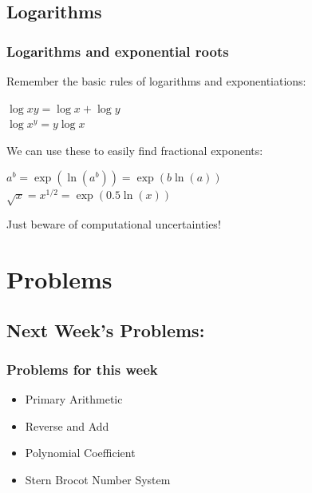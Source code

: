 \documentclass{beamer}
\begin{document}
\subsection{Logarithms}

\begin{frame}
  \frametitle{Logarithms and exponential roots} 

  Remember the basic rules of logarithms and exponentiations:
  \begin{center}
    $\log{xy} = \log{x} + \log{y}$\\
    $\log{x^y} = y\log{x}$
  \end{center}
  We can use these to easily find fractional exponents:
  \begin{center}
    $a^b = \exp(\ln(a^b)) = \exp(b\ln(a))$\\
    $\sqrt{x} = x^{1/2} = \exp(0.5\ln(x))$
  \end{center}
  Just beware of computational uncertainties!
\end{frame}


\section{Problems}
\subsection{Next Week's Problems:}
\begin{frame}
  \frametitle{Problems for this week}
  \begin{itemize}
  \item Primary Arithmetic
  \item Reverse and Add
  \item Polynomial Coefficient
  \item Stern Brocot Number System
  \end{itemize}
\end{frame}
\end{document}

